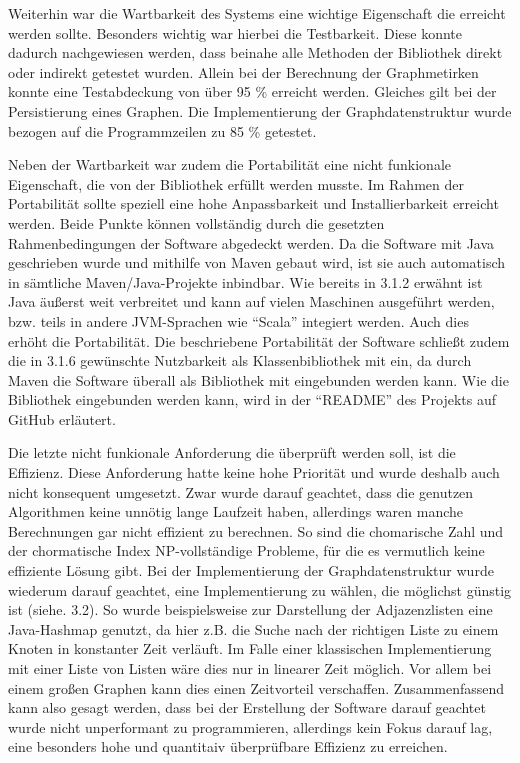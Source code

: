 \documentclass[a4paper,12pt,ngerman,chapterprefix=false,listof=totoc,bibliography=totoc]{scrreprt}
\begin{document}
{{{Weiterhin war die Wartbarkeit des Systems eine wichtige Eigenschaft die erreicht werden sollte. Besonders wichtig war hierbei die Testbarkeit. Diese konnte dadurch nachgewiesen werden, dass beinahe alle Methoden der Bibliothek direkt oder indirekt getestet wurden. Allein bei der Berechnung der Graphmetirken konnte eine Testabdeckung von über 95 \% erreicht werden. Gleiches gilt bei der Persistierung eines Graphen. Die Implementierung der Graphdatenstruktur wurde bezogen auf die Programmzeilen zu 85 \% getestet. 

Neben der Wartbarkeit war zudem die Portabilität eine nicht funkionale Eigenschaft, die von der Bibliothek erfüllt werden musste. Im Rahmen der Portabilität sollte speziell eine hohe Anpassbarkeit und Installierbarkeit erreicht werden. Beide Punkte können vollständig durch die gesetzten Rahmenbedingungen der Software abgedeckt werden. Da die Software mit Java geschrieben wurde und mithilfe von Maven gebaut wird, ist sie auch automatisch in sämtliche Maven/Java-Projekte inbindbar. Wie bereits in 3.1.2 erwähnt ist Java äußerst weit verbreitet und kann auf vielen Maschinen ausgeführt werden, bzw. teils in andere JVM-Sprachen wie "`Scala"' integiert werden. \cite{ullenboom_java_2016} Auch dies erhöht die Portabilität. Die beschriebene Portabilität der Software schließt zudem die in 3.1.6 gewünschte Nutzbarkeit als Klassenbibliothek mit ein, da durch Maven die Software überall als Bibliothek mit eingebunden werden kann. Wie die Bibliothek eingebunden werden kann, wird in der "`README"' des Projekts auf GitHub erläutert.

Die letzte nicht funkionale Anforderung die überprüft werden soll, ist die Effizienz. Diese Anforderung hatte keine hohe Priorität und wurde deshalb auch nicht konsequent umgesetzt. Zwar wurde darauf geachtet, dass die genutzen Algorithmen keine unnötig lange Laufzeit haben, allerdings waren manche Berechnungen gar nicht effizient zu berechnen. So sind die chomarische Zahl und der chormatische Index NP-vollständige Probleme, für die es vermutlich keine effiziente Lösung gibt. Bei der Implementierung der Graphdatenstruktur wurde wiederum darauf geachtet, eine Implementierung zu wählen, die möglichst günstig ist (siehe. 3.2). So wurde beispielsweise zur Darstellung der Adjazenzlisten eine Java-Hashmap genutzt, da hier z.B. die Suche nach der richtigen Liste zu einem Knoten in konstanter Zeit verläuft. Im Falle einer klassischen Implementierung mit einer Liste von Listen wäre dies nur in linearer Zeit möglich. Vor allem bei einem großen Graphen kann dies einen Zeitvorteil verschaffen. Zusammenfassend kann also gesagt werden, dass bei der Erstellung der Software darauf geachtet wurde nicht unperformant zu programmieren, allerdings kein Fokus darauf lag, eine besonders hohe und quantitaiv überprüfbare Effizienz zu erreichen.
}
}}
\end{document}
